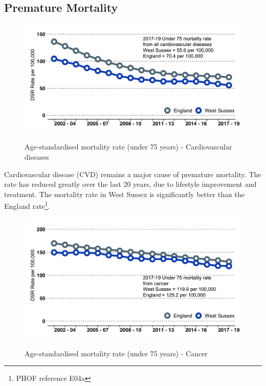 \subsection{Premature Mortality}
\begin{figure}[htp]
    \caption[Age-standardised mortality rate (under 75 years) - Cardiovascular diseases]{Age-standardised mortality rate (under 75 years) - Cardiovascular diseases}
    \centering
    \includegraphics[width=.95\linewidth]{images/u75_cvd_line_3y.png}
    \label{fig:u75_cvd}
\end{figure}

Cardiovascular disease (CVD) remains a major cause of premature mortality. The rate has reduced greatly over the last 20 years, due to lifestyle improvement and treatment. The mortality rate in West Sussex is significantly better than the England rate\footnote{PHOF reference E04a}. 

\begin{figure}[htp]
    \caption[Age-standardised mortality rate (under 75 years) - Cancer]{Age-standardised mortality rate (under 75 years) - Cancer}
    \centering
    \includegraphics[width=.95\linewidth]{images/u75_cancer_line_3y.png}
    \label{fig:u75_cancer}
\end{figure}

